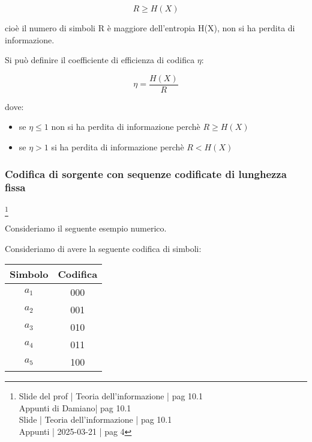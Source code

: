 {
    \Large 
    \begin{equation}
        R \ge H(X)
    \end{equation}
}

cioè il numero di simboli R è maggiore dell'entropia H(X), non si ha perdita di informazione. \newline 

Si può definire il coefficiente di efficienza di codifica $\eta$: 

{
    \Large 
    \begin{equation}
        \eta 
        = 
        \frac{H (X)}{R}
    \end{equation}
}

dove:

\begin{itemize}
    \item se $\eta \le 1$ non si ha perdita di informazione perchè $R \ge H(X)$ 
    \item se $\eta > 1$ si ha perdita di informazione perchè $R < H(X)$ 
\end{itemize}

\newpage 

\subsubsection{Codifica di sorgente con sequenze codificate di lunghezza fissa}
\footnote{Slide del prof | Teoria dell'informazione | pag 10.1 \\  
Appunti di Damiano| pag 10.1 \\
Slide | Teoria dell'informazione | pag 10.1 \\
Appunti | 2025-03-21 | pag 4
}

Consideriamo il seguente esempio numerico. \newline 

Consideriamo di avere la seguente codifica di simboli: 

{
    \Large 
    \begin{center}
        \begin{tabular}{|c c|}
            \hline
            \textbf{Simbolo} & \textbf{Codifica} \\
            \hline 
            \hline
            $a_1$ & 000 \\
            $a_2$ & 001 \\
            $a_3$ & 010 \\
            $a_4$ & 011 \\
            $a_5$ & 100 \\
            \hline
        \end{tabular}
    \end{center}
}

